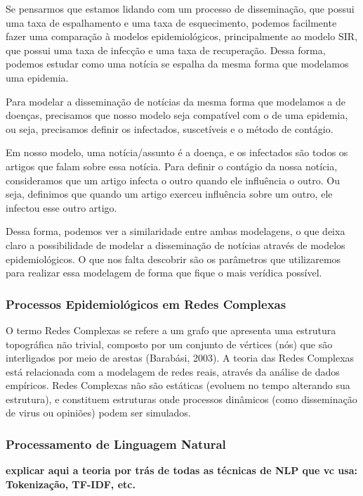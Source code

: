 \documentclass[a4paper,12pt]{article}
\begin{document}
Se pensarmos que estamos lidando com um processo de disseminação, que possui uma taxa de espalhamento e uma taxa de esquecimento, podemos
facilmente fazer uma comparação à modelos epidemiológicos, principalmente ao modelo SIR, que possui uma taxa de infecção e
uma taxa de recuperação. Dessa forma, podemos estudar como uma notícia se espalha da mesma forma que modelamos uma epidemia.

Para modelar a disseminação de notícias da mesma forma que modelamos a de doenças, precisamos
que nosso modelo seja compatível com o de uma epidemia, ou seja, precisamos definir os infectados, suscetíveis e o método de contágio.

Em nosso modelo, uma notícia/assunto é a doença, e os infectados são todos os artigos que falam sobre essa notícia. 
Para definir o contágio da nossa notícia, consideramos que um artigo infecta o outro quando ele influência o outro. Ou seja,
definimos que quando um artigo exerceu influência sobre um outro, ele infectou esse outro artigo. 

Dessa forma, podemos ver a similaridade entre ambas modelagens, o que deixa claro a possibilidade de modelar a disseminação de
notícias através de modelos epidemiológicos. O que nos falta descobrir são os parâmetros que utilizaremos para realizar essa modelagem
de forma que fique o mais verídica possível.

\subsubsection{Processos Epidemiológicos em Redes Complexas}

O termo Redes Complexas se refere a um grafo que apresenta uma estrutura topográfica não trivial, composto por um conjunto
 de vértices (nós) que são interligados por meio de arestas (Barabási, 2003). A teoria das Redes Complexas  está relacionada com a modelagem de redes reais, através da 
 análise de dados empíricos. Redes Complexas não são estáticas (evoluem no tempo alterando sua estrutura), e 
 constituem estruturas onde processos dinâmicos (como disseminação de virus ou opiniões) podem ser simulados.
 
 
\subsubsection{Processamento de Linguagem Natural}
\label{sec:nlp}

\textbf{explicar aqui a teoria por trás de todas as técnicas de NLP que vc usa: Tokenização, TF-IDF, etc.}
\end{document}
